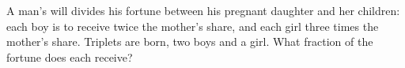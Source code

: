 A man's will divides his fortune between his pregnant daughter and her children: each boy is to receive twice the mother's share, and each girl three times the mother's share. Triplets are born, two boys and a girl. What fraction of the fortune does each receive?
